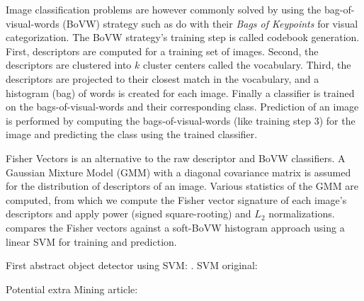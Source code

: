 \documentclass[thesis.tex]{subfiles}
\begin{document}
Image classification problems are however commonly solved by using the bag-of-visual-words (BoVW) strategy such as \citet{csurka2004visual} do with their \emph{Bags of Keypoints} for visual categorization. The BoVW strategy's training step is called codebook generation. First, descriptors are computed for a training set of images. Second, the descriptors are clustered into $k$ cluster centers called the vocabulary. Third, the descriptors are projected to their closest match in the vocabulary, and a histogram (bag) of words is created for each image. Finally a classifier is trained on the bags-of-visual-words and their corresponding class. Prediction of an image is performed by computing the bags-of-visual-words (like training step 3) for the image and predicting the class using the trained classifier.

Fisher Vectors \cite{sanchez2013image} is an alternative to the raw descriptor and BoVW classifiers. A Gaussian Mixture Model (GMM) with a diagonal covariance matrix is assumed for the distribution of descriptors of an image. Various statistics of the GMM are computed, from which we compute the Fisher vector signature of each image's descriptors and apply power (signed square-rooting) and $L_2$ normalizations. \citet{sanchez2013image} compares the Fisher vectors against a soft-BoVW histogram approach using a linear SVM for training and prediction.

First abstract object detector using SVM: \cite{papageorgiou2000trainable}.
SVM original: \cite{boser1992training}
 
Potential extra Mining article: \cite{fernando2014mining}

\subbibliography
\end{document}
